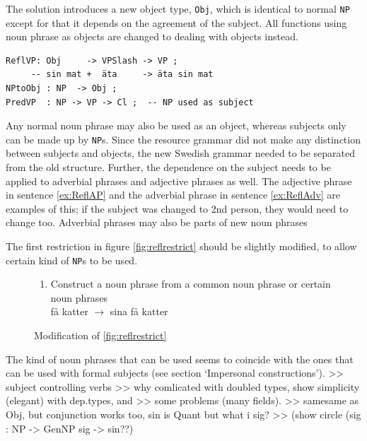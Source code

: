 \documentclass{report}
\begin{document}
The solution introduces a new object type, \verb_Obj_, which is
identical to normal \verb_NP_ except for that it depends on the agreement of
the subject. All functions using noun phrase as objects are changed to dealing
with objects instead.
\begin{verbatim}
ReflVP: Obj     -> VPSlash -> VP ;
     -- sin mat +  äta     -> äta sin mat 
NPtoObj : NP  -> Obj ;
PredVP  : NP -> VP -> Cl ;  -- NP used as subject
\end{verbatim}
Any normal noun phrase may also be used as an object, whereas subjects only
can be made up by \verb-NP-s.
Since the resource grammar did not make any distinction between
subjects and objects, the new Swedish grammar needed to be separated from the old
structure. 
Further, the dependence on the subject needs to be applied to adverbial phrases and
adjective phrases as well. The adjective phrase in sentence \ref{ex:ReflAP} and
the adverbial phrase in sentence \ref{ex:ReflAdv} are examples of this; if the
subject was changed to 2nd person, they  would need to change too.
 \label{ex:ReflAP2}
\vspace{-2mm}
 \label{ex:ReflAdv2}
Adverbial phrases may also be parts of new noun phrases

The first restriction in figure \ref{fig:reflrestrict} should be slightly
modified, to allow certain kind of \verb|NP|s to be used.
\begin{figure}[h]
\begin{enumerate}
\item{
Construct a noun phrase from a common noun phrase or certain noun phrases \\
få katter $\rightarrow$ sina få katter} 
\end{enumerate}
\caption{Modification of \ref{fig:reflrestrict}}
\end{figure}

The kind of noun phrases that can be used seems to coincide with the ones
that can be used with formal subjects (see section `Impersonal constructions').
>> subject controlling verbs
>> why comlicated with doubled types, show simplicity (elegant) with dep.types, and
>> some problems (many fields).
>> samesame as Obj, but conjunction works too, sin is Quant but what i sig?
>> (show circle (sig : NP -> GenNP sig -> sin??)
\end{document}
